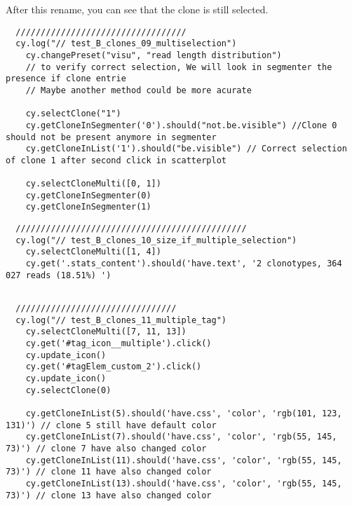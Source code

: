 \bigskip

After this rename, you can see that the clone is still selected.
\begin{verbatim}
  //////////////////////////////////
  cy.log("// test_B_clones_09_multiselection")
    cy.changePreset("visu", "read length distribution")
    // to verify correct selection, We will look in segmenter the presence if clone entrie
    // Maybe another method could be more acurate

    cy.selectClone("1")
    cy.getCloneInSegmenter('0').should("not.be.visible") //Clone 0 should not be present anymore in segmenter
    cy.getCloneInList('1').should("be.visible") // Correct selection of clone 1 after second click in scatterplot

    cy.selectCloneMulti([0, 1])
    cy.getCloneInSegmenter(0)
    cy.getCloneInSegmenter(1)

\end{verbatim}

\begin{verbatim}
  //////////////////////////////////////////////
  cy.log("// test_B_clones_10_size_if_multiple_selection")
    cy.selectCloneMulti([1, 4])
    cy.get('.stats_content').should('have.text', '2 clonotypes, 364 027 reads (18.51%) ')


\end{verbatim}

\begin{verbatim}
  ////////////////////////////////
  cy.log("// test_B_clones_11_multiple_tag")
    cy.selectCloneMulti([7, 11, 13])
    cy.get('#tag_icon__multiple').click()
    cy.update_icon()
    cy.get('#tagElem_custom_2').click()
    cy.update_icon()
    cy.selectClone(0)

    cy.getCloneInList(5).should('have.css', 'color', 'rgb(101, 123, 131)') // clone 5 still have default color
    cy.getCloneInList(7).should('have.css', 'color', 'rgb(55, 145, 73)') // clone 7 have also changed color
    cy.getCloneInList(11).should('have.css', 'color', 'rgb(55, 145, 73)') // clone 11 have also changed color
    cy.getCloneInList(13).should('have.css', 'color', 'rgb(55, 145, 73)') // clone 13 have also changed color


\end{verbatim}

